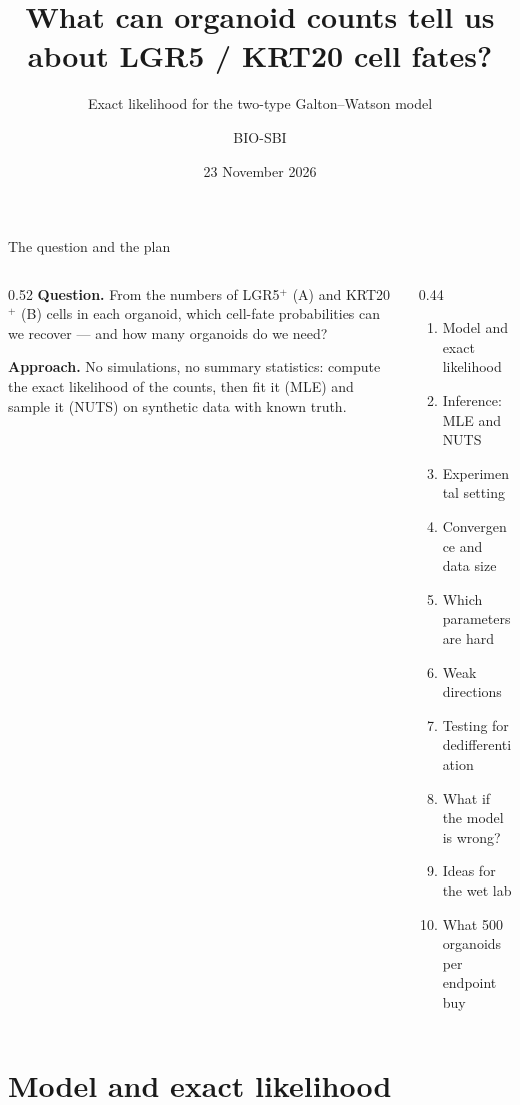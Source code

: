 \documentclass[aspectratio=169,11pt]{beamer}
\title{What can organoid counts tell us\\ about LGR5 / KRT20 cell fates?}
\subtitle{Exact likelihood for the two-type Galton--Watson model}
\date{23 November 2026}
\author{BIO-SBI}
\begin{document}
\begin{frame}
\titlepage
\end{frame}

\begin{frame}{The question and the plan}
\begin{columns}[T]
\begin{column}{0.52\textwidth}
\textbf{Question.} From the numbers of LGR5$^+$ (A) and KRT20$^+$ (B) cells in each organoid, which cell-fate probabilities can we recover --- and how many organoids do we need?

\medskip
\textbf{Approach.} No simulations, no summary statistics: compute the \alert{exact likelihood} of the counts, then fit it (MLE) and sample it (NUTS) on synthetic data with known truth.
\end{column}
\begin{column}{0.44\textwidth}\small
\begin{enumerate}
\item Model and exact likelihood
\item Inference: MLE and NUTS
\item Experimental setting
\item Convergence and data size
\item Which parameters are hard
\item Weak directions
\item Testing for dedifferentiation
\item What if the model is wrong?
\item Ideas for the wet lab
\item What 500 organoids per endpoint buy
\end{enumerate}
\end{column}
\end{columns}
\end{frame}

\section{Model and exact likelihood}
\end{document}
